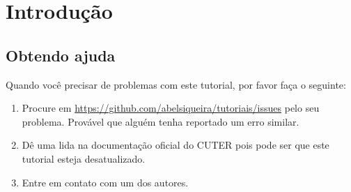 \section{Introdução}
\subsection{Obtendo ajuda}
Quando você precisar de problemas com este tutorial, por favor faça o seguinte:
\begin{enumerate}
    \item Procure em \url{https://github.com/abelsiqueira/tutoriais/issues} pelo
        seu problema. Provável que alguém tenha reportado um erro similar.
    \item Dê uma lida na documentação oficial do CUTER pois pode ser que este
        tutorial esteja desatualizado.
    \item Entre em contato com um dos autores.
\end{enumerate}
